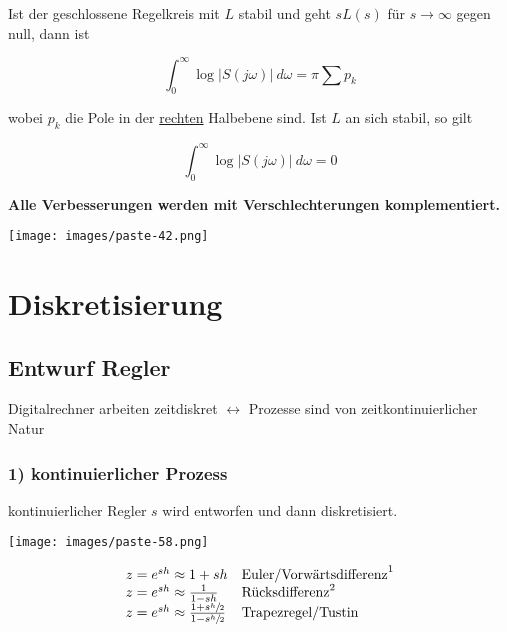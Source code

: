 \documentclass[
  10pt,
  a4paper,
  twocolumn]{article}
\numberwithin{equation}{section}
\begin{document}
\begin{tcolorbox}[enhanced jigsaw, coltitle=black, colback=white, breakable, colframe=quarto-callout-note-color-frame, rightrule=.15mm, left=2mm, opacityback=0, leftrule=.75mm, toptitle=1mm, colbacktitle=quarto-callout-note-color!10!white, bottomtitle=1mm, arc=.35mm, bottomrule=.15mm, title=\textcolor{quarto-callout-note-color}{\faInfo}\hspace{0.5em}{Bode's Integral}, titlerule=0mm, toprule=.15mm, opacitybacktitle=0.6]

Ist der geschlossene Regelkreis mit \(L\) stabil und geht \(sL(s)\) für
\(s\rightarrow\infty\) gegen null, dann ist

\[
\int_0^\infty \log\lvert S(j\omega)\rvert\ d\omega = \pi \sum p_k
\]

wobei \(p_k\) die Pole in der \ul{rechten} Halbebene sind. Ist \(L\) an
sich stabil, so gilt

\[
\int_0^\infty\log\lvert S(j\omega)\rvert\ d\omega = 0
\]

\end{tcolorbox}

\textbf{Alle Verbesserungen werden mit Verschlechterungen
komplementiert.}

\texttt{[image: images/paste-42.png]}

\section{Diskretisierung}\label{diskretisierung}

\subsection{Entwurf Regler}\label{entwurf-regler}

Digitalrechner arbeiten zeitdiskret \(\leftrightarrow\) Prozesse sind
von zeitkontinuierlicher Natur

\subsubsection{1) kontinuierlicher
Prozess}\label{kontinuierlicher-prozess}

kontinuierlicher Regler \(s\) wird entworfen und dann diskretisiert.

\texttt{[image: images/paste-58.png]}

\[
\begin{array}{ll}
  z = e^{sh} \approx 1+sh & \text{Euler/Vorwärtsdifferenz}^1 \\
  z = e^{sh} \approx \frac1{1-sh} & \text{Rücksdifferenz}^2 \\
  z = e^{sh} \approx \frac{1+s\sfrac{h}{2}}{1-s\sfrac{h}{2}} & \text{Trapezregel/Tustin} \\
\end{array}
\]
\end{document}

